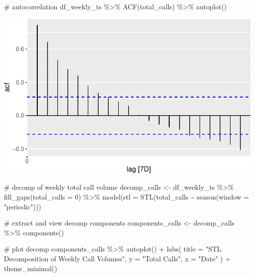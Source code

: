 \documentclass[
  letterpaper,
  DIV=11,
  numbers=noendperiod]{scrartcl}
\newenvironment{Shaded}{\begin{snugshade}}{\end{snugshade}}
\newcommand{\AttributeTok}[1]{\textcolor[rgb]{0.40,0.45,0.13}{#1}}
\newcommand{\CommentTok}[1]{\textcolor[rgb]{0.37,0.37,0.37}{#1}}
\newcommand{\DecValTok}[1]{\textcolor[rgb]{0.68,0.00,0.00}{#1}}
\newcommand{\FunctionTok}[1]{\textcolor[rgb]{0.28,0.35,0.67}{#1}}
\newcommand{\NormalTok}[1]{\textcolor[rgb]{0.00,0.23,0.31}{#1}}
\newcommand{\OtherTok}[1]{\textcolor[rgb]{0.00,0.23,0.31}{#1}}
\newcommand{\SpecialCharTok}[1]{\textcolor[rgb]{0.37,0.37,0.37}{#1}}
\newcommand{\StringTok}[1]{\textcolor[rgb]{0.13,0.47,0.30}{#1}}
\begin{document}
\begin{Shaded}
\begin{Highlighting}[]
\CommentTok{\# autocorrelation}
\NormalTok{df\_weekly\_ts }\SpecialCharTok{\%\textgreater{}\%}
  \FunctionTok{ACF}\NormalTok{(total\_calls) }\SpecialCharTok{\%\textgreater{}\%}
  \FunctionTok{autoplot}\NormalTok{()}
\end{Highlighting}
\end{Shaded}

\includegraphics{final_proj_group1_files/figure-pdf/weekly-2.pdf}

\begin{Shaded}
\begin{Highlighting}[]
\CommentTok{\# decomp of weekly total call volume}
\NormalTok{decomp\_calls }\OtherTok{\textless{}{-}}\NormalTok{ df\_weekly\_ts }\SpecialCharTok{\%\textgreater{}\%}
  \FunctionTok{fill\_gaps}\NormalTok{(}\AttributeTok{total\_calls =} \DecValTok{0}\NormalTok{) }\SpecialCharTok{\%\textgreater{}\%}
  \FunctionTok{model}\NormalTok{(}\AttributeTok{stl =} \FunctionTok{STL}\NormalTok{(total\_calls }\SpecialCharTok{\textasciitilde{}} \FunctionTok{season}\NormalTok{(}\AttributeTok{window =} \StringTok{"periodic"}\NormalTok{)))}

\CommentTok{\# extract and view decomp components}
\NormalTok{components\_calls }\OtherTok{\textless{}{-}}\NormalTok{ decomp\_calls }\SpecialCharTok{\%\textgreater{}\%}
  \FunctionTok{components}\NormalTok{()}

\CommentTok{\# plot decomp}
\NormalTok{components\_calls }\SpecialCharTok{\%\textgreater{}\%}
  \FunctionTok{autoplot}\NormalTok{() }\SpecialCharTok{+}
  \FunctionTok{labs}\NormalTok{(}
    \AttributeTok{title =} \StringTok{"STL Decomposition of Weekly Call Volumes"}\NormalTok{, }
    \AttributeTok{y =} \StringTok{"Total Calls"}\NormalTok{, }
    \AttributeTok{x =} \StringTok{"Date"}
\NormalTok{  ) }\SpecialCharTok{+}
  \FunctionTok{theme\_minimal}\NormalTok{()}
\end{Highlighting}
\end{Shaded}
\end{document}
